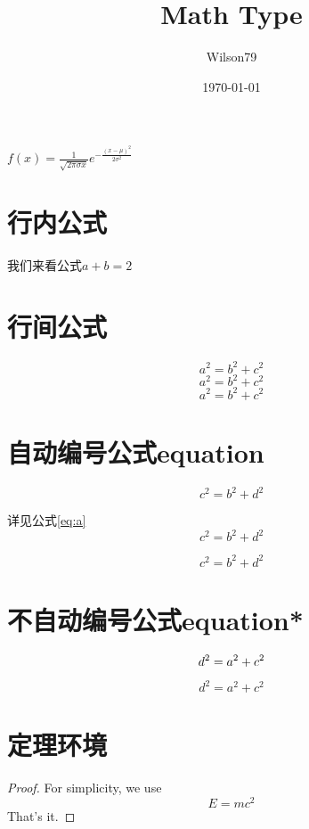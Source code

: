 \documentclass{article}
\title{Math Type}
\author{Wilson79}
\date{\today}
\begin{document}
 
	\tableofcontents %
	\maketitle %
	
	$f(x)=\frac{1}{\sqrt{2 \pi \sigma x}} e^{-\frac{(x-\mu)^{2}}{2 \sigma^{2}}}$
	
	\section{行内公式} %

	我们来看公式$a+b=2$ %

    \section{行间公式}

	\[a^2 = b ^2 + c^2 \] %
	$$a^2 = b ^2 + c^2$$
	\begin{displaymath}
	a^2 = b ^2 + c^2
	\end{displaymath}

	\section{自动编号公式equation}
	\begin{equation} %
	 c^2 = b ^2 + d^2 
	\end{equation}

	详见公式\ref{eq:a}
	\begin{equation} 
	c^2 = b ^2 + d^2 \label{eq:a}
	\end{equation}

	\begin{equation} 
	 c^2 = b ^2 + d^2 \tag{*} 
	\end{equation}

	\section{不自动编号公式equation*}	
	\begin{equation}
	d^2 = a ^2 + c^2 \notag
	\end{equation}
	
	\begin{equation*}
	d^2 = a ^2 + c^2 
	\end{equation*}

	\section{定理环境}
	\begin{proof}
	For simplicity, we use
	\[
	E=mc^2
	\]
	That's it.
	\end{proof}
\end{document}
